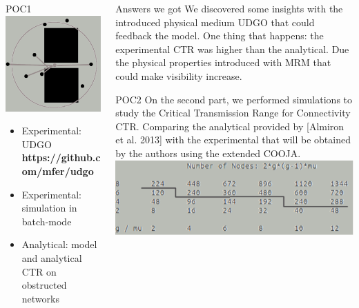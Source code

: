 \documentclass[final,hyperref={pdfpagelabels=false}]{beamer}
\begin{document}
\begin{frame}{}
\begin{columns}[t]
\begin{column}{.48\linewidth}
\begin{block}{POC1}
          \includegraphics[width=0.35\linewidth]{udgo}                    
          \begin{itemize}
          \item Experimental: UDGO  {\bf https://github.com/mfer/udgo}
          \item Experimental: simulation in batch-mode
          \item Analytical: model and analytical CTR on obstructed networks
          \end{itemize}                    
        \end{block}
      \end{column}
      \begin{column}{.48\linewidth}
        \begin{block}{Answers we got}
          \centering
          We discovered some insights with the introduced physical medium UDGO that could
          feedback the model. One thing that happens: the experimental CTR was higher
          than the analytical. Due the physical properties introduced with MRM that could make
          visibility increase.
        \end{block}  
        \begin{block}{POC2}
          \centering
          On the second part, we performed simulations to study the Critical Transmission Range for Connectivity CTR. Comparing the analytical provided by [Almiron et al. 2013] with the experimental that will be obtained by the authors using the extended COOJA. \newline
          \includegraphics[width=0.9\linewidth]{nNodes} \newline          

\end{block}
\end{column}
\end{columns}
\end{frame}
\end{document}
